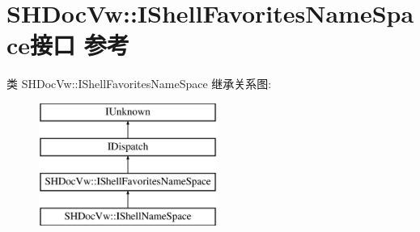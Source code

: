 \hypertarget{interface_s_h_doc_vw_1_1_i_shell_favorites_name_space}{}\section{S\+H\+Doc\+Vw\+:\+:I\+Shell\+Favorites\+Name\+Space接口 参考}
\label{interface_s_h_doc_vw_1_1_i_shell_favorites_name_space}
类 S\+H\+Doc\+Vw\+:\+:I\+Shell\+Favorites\+Name\+Space 继承关系图\+:\begin{figure}[H]
\begin{center}
\leavevmode
\includegraphics[height=4.000000cm]{interface_s_h_doc_vw_1_1_i_shell_favorites_name_space}
\end{center}
\end{figure}
